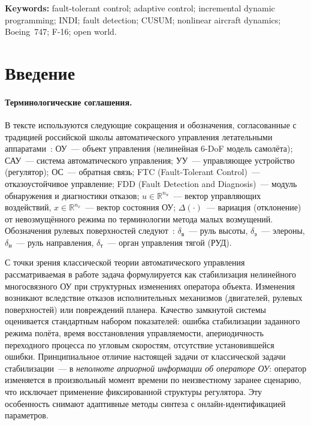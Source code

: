 \documentclass[a4paper,14pt]{extarticle}
\newcommand{\dv}{\delta_{\text{в}}}
\newcommand{\dn}{\delta_{\text{н}}}
\newcommand{\de}{\delta_{\text{э}}}
\newcommand{\dt}{\delta_{\text{т}}}
\begin{document}
\medskip
\noindent\textbf{Keywords:} fault-tolerant control; adaptive control; incremental dynamic programming; INDI; fault detection; CUSUM; nonlinear aircraft dynamics; Boeing~747; F-16; open world.

\bigskip

\section{Введение}

\paragraph{Терминологические соглашения.} В тексте используются следующие сокращения и обозначения, согласованные с традицией российской школы автоматического управления летательными аппаратами~\cite{borodin1978}: ОУ~--- объект управления (нелинейная 6-DoF модель самолёта); САУ~--- система автоматического управления; УУ~--- управляющее устройство (регулятор); ОС~--- обратная связь; FTC (Fault-Tolerant Control)~--- отказоустойчивое управление; FDD (Fault Detection and Diagnosis)~--- модуль обнаружения и диагностики отказов; $u\in\mathbb{R}^{n_u}$~--- вектор управляющих воздействий, $x\in\mathbb{R}^{n_x}$~--- вектор состояния ОУ; $\Delta(\cdot)$~--- вариация (отклонение) от невозмущённого режима по терминологии метода малых возмущений. Обозначения рулевых поверхностей следуют~\cite{borodin1978}: $\dv$~--- руль высоты, $\de$~--- элероны, $\dn$~--- руль направления, $\dt$~--- орган управления тягой (РУД).

С точки зрения классической теории автоматического управления рассматриваемая в работе задача формулируется как стабилизация нелинейного многосвязного ОУ при структурных изменениях оператора объекта. Изменения возникают вследствие отказов исполнительных механизмов (двигателей, рулевых поверхностей) или повреждений планера. Качество замкнутой системы оценивается стандартным набором показателей: ошибка стабилизации заданного режима полёта, время восстановления управляемости, апериодичность переходного процесса по угловым скоростям, отсутствие установившейся ошибки. Принципиальное отличие настоящей задачи от классической задачи стабилизации~--- в \emph{неполноте априорной информации об операторе ОУ}: оператор изменяется в произвольный момент времени по неизвестному заранее сценарию, что исключает применение фиксированной структуры регулятора. Эту особенность снимают адаптивные методы синтеза с онлайн-идентификацией параметров.
\end{document}
